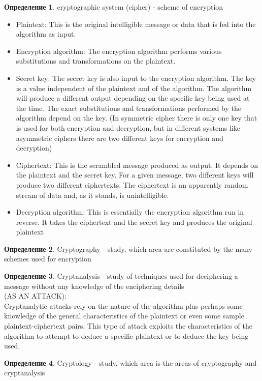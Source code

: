 \documentclass[a4paper]{article}
\theoremstyle{definition}
\newtheorem*{definition}{Определение}
\theoremstyle{remark}
\begin{document}
\begin{definition}
    cryptographic system (cipher) - scheme of encryption
    \begin{itemize}
        \item Plaintext: This is the original intelligible message or data that is fed into the
        algorithm as input.
        \item Encryption algorithm: The encryption algorithm performs various substitutions and transformations on the plaintext.
        \item Secret key: The secret key is also input to the encryption algorithm. The key is
        a value independent of the plaintext and of the algorithm. The algorithm will
        produce a different output depending on the specific key being used at the
        time. The exact substitutions and transformations performed by the algorithm
        depend on the key. (In symmetric cipher there is only one key that is used for both encryption and decryption, but in different
        systems like asymmetric ciphers there are two different keys for encryption and decryption)
        \item Ciphertext: This is the scrambled message produced as output. It depends on
        the plaintext and the secret key. For a given message, two different keys will
        produce two different ciphertexts. The ciphertext is an apparently random
        stream of data and, as it stands, is unintelligible.
        \item Decryption algorithm: This is essentially the encryption algorithm run in
        reverse. It takes the ciphertext and the secret key and produces the original
        plaintext
    \end{itemize}
\end{definition}
\begin{definition}
    Cryptography - study, which area are constituted by the many schemes used for
encryption
\end{definition}
\begin{definition}
    Cryptanalysis - study of techniques used for deciphering a
    message without any knowledge of the enciphering details\\
    (AS AN ATTACK):\\
    Cryptanalytic attacks rely on the nature of the algorithm plus
perhaps some knowledge of the general characteristics of the plaintext or
even some sample plaintext-ciphertext pairs. This type of attack exploits the
characteristics of the algorithm to attempt to deduce a specific plaintext or to
deduce the key being used.
\end{definition}
\begin{definition}
    Cryptology - study, which area is the areas
    of cryptography and cryptanalysis
\end{definition}
\end{document}
